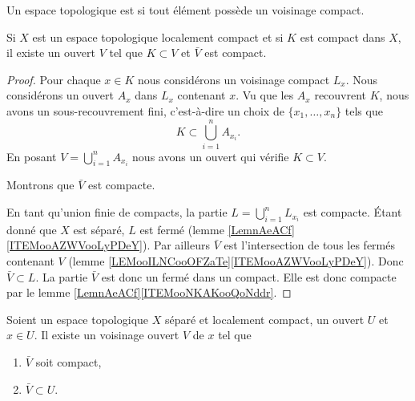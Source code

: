 \begin{definition}  \label{DefEIBYooAWoESf}
	Un espace topologique est  si tout élément possède un voisinage compact.
\end{definition}

\begin{lemma}       \label{LEMooAXESooYvyesg}
	Si \( X\) est un espace topologique localement compact et si \( K\) est compact dans \( X\), il existe un ouvert \( V\) tel que \( K\subset V\) et \( \bar V\) est compact.
\end{lemma}

\begin{proof}
	Pour chaque \( x\in K\) nous considérons un voisinage compact \( L_x\). Nous considérons un ouvert \( A_x\) dans \( L_x\) contenant \( x\). Vu que les \( A_x\) recouvrent \( K\), nous avons un sous-recouvrement fini, c'est-à-dire un choix de \( \{ x_1,\ldots,x_n \}\) tels que
	\begin{equation}
		K\subset\bigcup_{i=1}^nA_{x_i}.
	\end{equation}
	En posant \( V=\bigcup_{i=1}^nA_{x_i}\) nous avons un ouvert qui vérifie \( K\subset V\).

	Montrons que \( \bar V\) est compacte.

	En tant qu'union finie de compacts, la partie \( L=\bigcup_{i=1}^{n}L_{x_i}\) est compacte. Étant donné que \( X\) est séparé, \( L\) est fermé (lemme \ref{LemnAeACf}\ref{ITEMooAZWVooLyPDeY}). Par ailleurs \( \bar V\) est l'intersection de tous les fermés contenant \( V\) (lemme \ref{LEMooILNCooOFZaTe}\ref{ITEMooAZWVooLyPDeY}). Donc \( \bar V\subset L\). La partie \( \bar V\) est donc un fermé dans un compact. Elle est donc compacte par le lemme \ref{LemnAeACf}\ref{ITEMooNKAKooQoNddr}.
\end{proof}


\begin{proposition}	\label{PROPooACXGooHcQpxF}
	Soient un espace topologique \( X\) séparé et localement compact, un ouvert \( U\) et \( x\in U\). Il existe un voisinage ouvert \( V\) de \( x\) tel que
	\begin{enumerate}
		\item
		      \( \bar V\) soit compact,
		\item
		      \( \bar V\subset U\).
	\end{enumerate}
\end{proposition}

